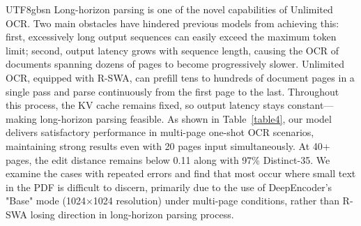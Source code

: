 \documentclass[11pt, a4paper, logo, copyright, nonumbering]{deepseek}
\begin{document}
\begin{CJK*}{UTF8}{gbsn}
Long-horizon parsing is one of the novel capabilities of Unlimited OCR. Two main obstacles have hindered previous models from achieving this: first, excessively long output sequences can easily exceed the maximum token limit; second, output latency grows with sequence length, causing the OCR of documents spanning dozens of pages to become progressively slower. Unlimited OCR, equipped with R-SWA, can prefill tens to hundreds of document pages in a single pass and parse continuously from the first page to the last. Throughout this process, the KV cache remains fixed, so output latency stays constant—making long-horizon parsing feasible. As shown in Table~\ref{table4}, our model delivers satisfactory performance in multi-page one-shot OCR scenarios, maintaining strong results even with 20 pages input simultaneously. At 40+ pages, the edit distance remains below 0.11 along with 97\% Distinct-35. We examine the cases with repeated errors and find that most occur where small text in the PDF is difficult to discern, primarily due to the use of DeepEncoder's "Base" mode (1024$\times$1024 resolution) under multi-page conditions, rather than R-SWA losing direction in long-horizon parsing process. 






\end{CJK*}
\end{document}

